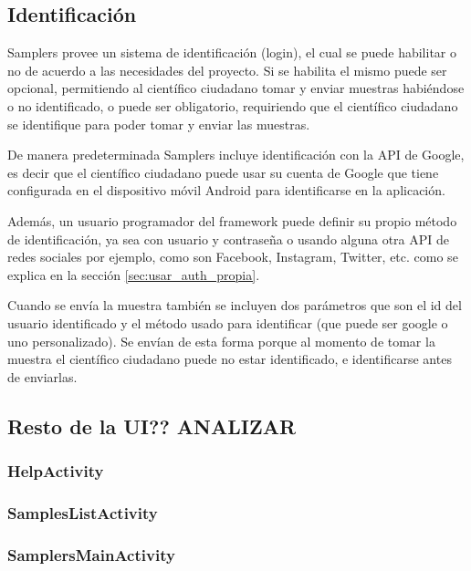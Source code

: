 \subsection{Identificación}
Samplers provee un sistema de identificación (login), el cual se puede habilitar o no de acuerdo a las necesidades del proyecto. Si se habilita el mismo puede ser opcional, permitiendo al científico ciudadano tomar y enviar muestras habiéndose o no identificado, o puede ser obligatorio, requiriendo que el científico ciudadano se identifique para poder tomar y enviar las muestras.

De manera predeterminada Samplers incluye identificación con la API de Google, es decir que el científico ciudadano puede usar su cuenta de Google que tiene configurada en el dispositivo móvil Android para identificarse en la aplicación.

Además, un usuario programador del framework puede definir su propio método de identificación, ya sea con usuario y contraseña o usando alguna otra API de redes sociales por ejemplo, como son Facebook, Instagram, Twitter, etc. como se explica en la sección \ref{sec:usar_auth_propia}.

Cuando se envía la muestra también se incluyen dos parámetros que son el id del usuario identificado y el método usado para identificar (que puede ser google o uno personalizado). Se envían de esta forma porque al momento de tomar la muestra el científico ciudadano puede no estar identificado, e identificarse antes de enviarlas.

\subsection{Resto de la UI?? ANALIZAR}


\subsubsection{HelpActivity}

\subsubsection{SamplesListActivity}

\subsubsection{SamplersMainActivity}





